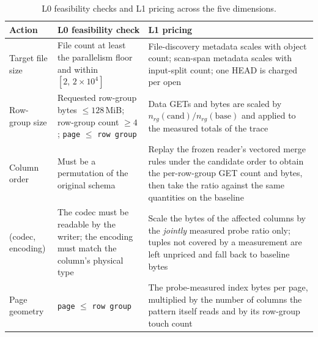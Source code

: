 \begin{table}[t]
\centering
\footnotesize
\caption{L0 feasibility checks and L1 pricing across the five dimensions.}
\label{tab:l0l1}

\begin{tabularx}{\columnwidth}{@{}
  >{\raggedright\arraybackslash}p{}
  Y
  Y
@{}}
\toprule
\textbf{Action} & \textbf{L0 feasibility check} & \textbf{L1 pricing} \\
\midrule
Target file size &
File count at least the parallelism floor and within $[2,\,2\times10^{4}]$ &
File-discovery metadata scales with object count; scan-span metadata scales
with input-split count; one HEAD is charged per open \\
\addlinespace[3pt]
Row-group size &
Requested row-group bytes $\le 128$\,MiB; row-group count $\ge 4$;
\texttt{page} $\le$ \texttt{row group} &
Data GETs and bytes are scaled by $n_{rg}(\mathrm{cand})/n_{rg}(\mathrm{base})$
and applied to the measured totals of the trace \\
\addlinespace[3pt]
Column order &
Must be a permutation of the original schema &
Replay the frozen reader's vectored merge rules under the candidate order to
obtain the per-row-group GET count and bytes, then take the ratio against the
same quantities on the baseline \\
\addlinespace[3pt]
(codec, encoding) &
The codec must be readable by the writer; the encoding must match the column's
physical type &
Scale the bytes of the affected columns by the \emph{jointly} measured probe
ratio only; tuples not covered by a measurement are left unpriced and fall back
to baseline bytes \\
\addlinespace[3pt]
Page geometry &
\texttt{page} $\le$ \texttt{row group} &
The probe-measured index bytes per page, multiplied by the number of columns
the pattern itself reads and by its row-group touch count \\
\bottomrule
\end{tabularx}
\end{table}

